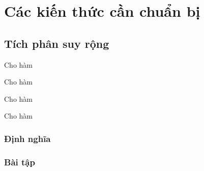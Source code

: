 \documentclass[12pt,a4paper]{report}
\makeatletter
\renewcommand\tableofcontents{%
  \null\hfill\textbf{\Large\contentsname}\hfill\null\par
  \@mkboth{\MakeUppercase\contentsname}{\MakeUppercase\contentsname}%
  \@starttoc{toc}%
}
\makeatother
\begin{document}
\tableofcontents
\chapter{Các kiến thức cần chuẩn bị}

\section{Tích phân suy rộng}
\begin{definetion}
Cho hàm
\end{definetion}

\begin{definetion}
Cho hàm
\end{definetion}

\begin{definetion}
Cho hàm
\end{definetion}

\begin{definetion}
Cho hàm
\end{definetion}
\subsection{Định nghĩa}
\subsection{Bài tập}
\end{document}
